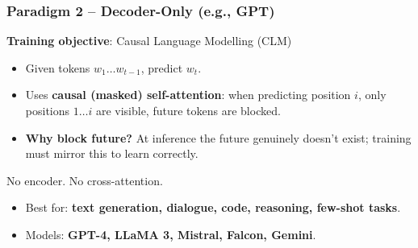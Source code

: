\begin{frame}[fragile]\frametitle{Paradigm 2 – Decoder-Only (e.g., GPT)}
    \textbf{Training objective}: Causal Language Modelling (CLM)
    \begin{itemize}
    \item Given tokens $w_1 \ldots w_{t-1}$, predict $w_t$.
    \item Uses \textbf{causal (masked) self-attention}: when predicting position $i$, only positions $1 \ldots i$ are visible,  future tokens are blocked.
    \item \textbf{Why block future?} At inference the future genuinely doesn't exist; training must mirror this to learn correctly.
    \end{itemize}
    \vspace{0.3em}
    No encoder. No cross-attention.
    \begin{itemize}
    \item Best for: \textbf{text generation, dialogue, code, reasoning, few-shot tasks}.
    \item Models: \textbf{GPT-4, LLaMA 3, Mistral, Falcon, Gemini}.
    \end{itemize}
\end{frame}

